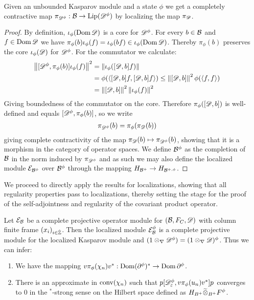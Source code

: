 \begin{proposition}
Given an unbounded Kasparov module and a state $\phi$ we get a completely contractive map $\pi_{\D^\phi}:\B\to \lip(\D^\phi)$ by localizing the map $\pi_{\mathscr{D}}$.
\end{proposition}
\begin{proof}
	By definition, $\iota_\phi(\dom \D)$ is a core for $\D^\phi$. For every $b\in \mathcal{B}$ and $f\in \operatorname{Dom} \mathscr{D}$ we have $\pi_\phi(b)\iota_\phi(f)=\iota_\phi(bf)\in \iota_\phi(\dom \D)$. Thereby $\pi_\phi(b)$ preserves the core $\iota_\phi(\D)$ for $\D^\phi$. For the commutator we calculate:
	\begin{align*}
		\norm{[\D^\phi,\pi_\phi(b)]\iota_\phi(f)}^2&=\norm{\iota_\phi([\D,b]f)} \\
		&=\phi(\ip{[\D,b]f}{[\D,b]f})\leq \norm{[\D,b]}^2\phi(\ip{f}{f}) \\
		&=\norm{[\D,b]}^2\norm{\iota_\phi(f)}^2
	\end{align*}
	Giving boundedness of the commutator on the core. Therefore $\pi_\phi([\D,b])$ is well-defined and equals $[\D^\phi,\pi_\phi(b)]$, so we write 
	\begin{align*}
		\pi_{\D^\phi}(b)=\pi_\phi(\pi_\D(b))
	\end{align*}
	giving complete contractivity of the map $\pi_\D(b)\mapsto \pi_{\D^\phi}(b)$, showing that it is a morphism in the category of operator spaces. We define $\B^\phi$ as the completion of $\mathcal{B}$ in the norm induced by $\pi_{\D^\phi}$ and as such we may also define the localized module $\E_{\B^\phi}$ over $\B^\phi$ through the mapping $H_{\B^+}\to H_{\B^{+,\phi}}$.
\end{proof}
We proceed to directly apply the results for localizations, showing that all regularity properties pass to localizations, thereby setting the stage for the proof of the self-adjointness and regularity of the covariant  product operator.
\begin{lemma}\label{mesrennie317}
	Let $\mathcal{E}_{\mathcal{B}}$ be a complete projective operator module for $(\mathcal{B},F_C,\mathscr{D})$ with column finite frame $(x_i)_{i\in \hat{\mathbb{Z}}}$. Then the localized module $\E_{\B}^\phi$ is a complete projective module for the localized Kasparov module and $(1\tens_\nabla \D^\phi)=(1\tens_\nabla \D)^{\phi}$. Thus we can infer:
	\begin{enumerate}
		\item
			We have the mapping $v\pi_\phi(\chi_n) v^*: \dom(\part^\phi)^*\to \dom \part^\phi$.
		\item
			There is an approximate in $\operatorname{conv}(\chi_n)$ such that $p[\D_\epsilon^\phi, v\pi_\phi(u_n)v^*]p$ converges to $0$ in the $^*$-strong sense on the Hilbert space defined as $H_{B^+}\optens_{B^+} F^\phi$. 
	\end{enumerate}
\end{lemma}
